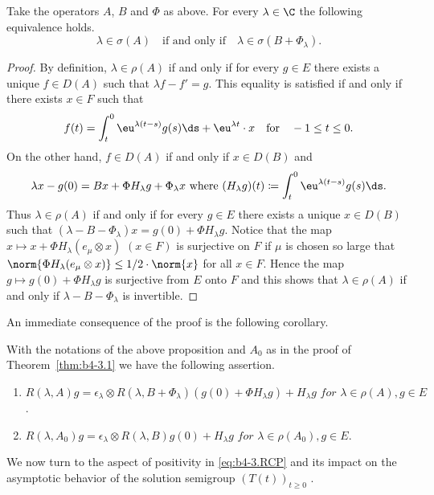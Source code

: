 \begin{proposition}\label{prop:b4-3.4}
	Take the operators $A$, $B$ and $\Phi$ as above. 
    For every $\lambda \in \C$ the following equivalence holds. 
	\begin{equation}\label{eq:b4-3.4}
		\lambda \in \sigma(A) \quad \text{if and only if} \quad \lambda \in \sigma(B + \Phi_\lambda).
	\end{equation}
\end{proposition}
\begin{proof} By definition, $\lambda \in \rho(A)$ if and only if for every $g \in E$ there exists a unique $f \in D(A)$ such that $\lambda f - f' = g$. 
This equality is satisfied if and only if there exists $x \in F$ such that
\[
f(t) = \int_t^0 \eu^{\lambda(t-s)} g(s)  \ds  + \eu^{\lambda t} \cdot x \quad \text{for} \quad -1 \leq t \leq 0   .
\]
On the other hand, $f \in D(A)$ if and only if\/ $x \in D(B)$ and
\[
\text{$\lambda x - g(0) = Bx + \Phi H_\lambda g + \Phi_\lambda x$ where $(H_\lambda g)(t) \coloneq  \int_t^0 \eu^{\lambda(t-s)} g(s)  \ds  .$}
\]
Thus $\lambda \in \rho(A)$ if and only if for every $g \in E$ there exists a unique $x \in D(B)$ such that $(\lambda - B - \Phi_\lambda)x = g(0) + \Phi H_\lambda g$. 
Notice that the map $x \mapsto x + \Phi H_\lambda(e_\mu \otimes x)$ $(x \in F)$ is surjective on $F$ if\/ $\mu$ is chosen so large that $\norm{\Phi H_\lambda(e_\mu \otimes x)} \leq 1/2 \cdot \norm{x}$ for all $x \in F$. 
Hence the map $g \mapsto g(0) + \Phi H_\lambda g$ is surjective from $E$ onto $F$ and this shows that $\lambda \in \rho(A)$ if and only if\/ $\lambda - B - \Phi_\lambda$ is invertible.
\end{proof}
An immediate consequence of the proof is the following corollary.

\begin{corollary*}
With the notations of the above proposition and $A_{0}$ as in the proof of Theorem~\ref{thm:b4-3.1} we have the following assertion.
\begin{enumerate}[\upshape (i)]
	\item  
	$R(\lambda,A)g = \epsilon_\lambda \otimes R(\lambda,B+\Phi_\lambda)(g(0)+\Phi H_\lambda g) + H_\lambda g \textit{ for } \lambda \in \rho(A), g \in E$.

	\item 
	$R(\lambda,A_{0})g = \epsilon_\lambda \otimes R(\lambda,B)g(0) + H_\lambda g \textit{ for }  \lambda \in \rho(A_{0}), g \in E$.
\end{enumerate}
\end{corollary*}
We now turn to the aspect of positivity in \eqref{eq:b4-3.RCP} and its impact on the asymptotic behavior of the solution semigroup $(T(t))_{t \geq 0}$ .

